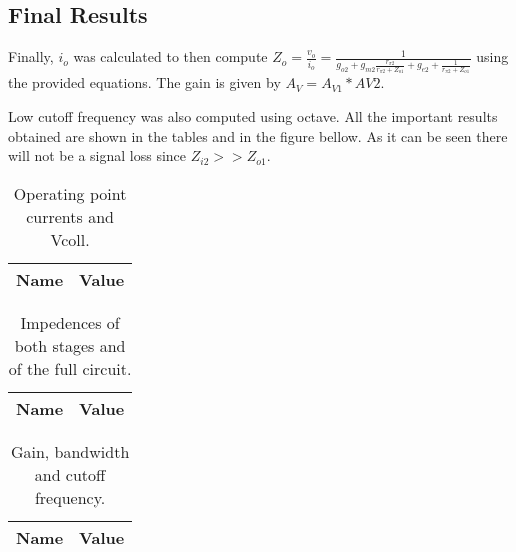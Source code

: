 \subsection{Final Results}


Finally, $i_o$ was calculated to then compute $Z_o=\frac{v_{o}}{i_o}=\frac{1}{g_{o2}+g_{m2}\frac{r_{\pi 2}}{r_{\pi 2}+Z_{o1}}+g_{e2}+\frac{1}{r_{\pi 2}+Z_{o1}}}$ using the provided equations. The gain is given by $A_V = A_{V1}*{AV2}$.

Low cutoff frequency was also computed using octave.
All the important results obtained are shown in the tables and in the figure bellow. As it can be seen there will not be a signal loss since $Z_{i2}>>Z_{o1}$.


\begin{table}[h!]
  \centering
  \begin{tabular}{|l|r|}
    \hline    
    {\bf Name} & {\bf Value} \\ \hline
    
  \end{tabular}
  \caption{Operating point currents and Vcoll.}
  \label{tab:1}
\end{table}


\begin{table}[h!]
  \centering
  \begin{tabular}{|l|r|}
    \hline    
    {\bf Name} & {\bf Value} \\ \hline
    
  \end{tabular}
  \caption{Impedences of both stages and of the full circuit.}
  \label{tab:2}
\end{table}

\vspace{3cm}

\begin{table}[h!]
  \centering
  \begin{tabular}{|l|r|}
    \hline    
    {\bf Name} & {\bf Value} \\ \hline
    
  \end{tabular}
  \caption{Gain, bandwidth and cutoff frequency.}
  \label{tab:3}
\end{table}

\vspace{1cm}












